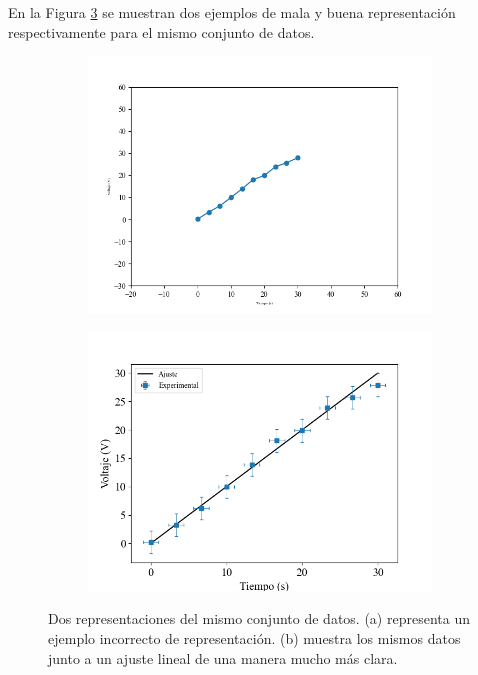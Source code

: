 \documentclass{book}
\begin{document}
En la Figura \ref{fig:dosgrafs} se muestran dos ejemplos de mala y buena representación 
respectivamente para el mismo conjunto de datos.

\begin{figure}[h]
  
  \begin{adjustwidth}{-3cm}{-4.5cm}
  \centering
  \begin{subfigure}{0.45\pdfpagewidth}
      \centering
      \includegraphics[width=\linewidth]{assets/fig/malagrafica.png}
      \caption{}
      \label{fig:malagraf}
  \end{subfigure}
  \hfill
  \begin{subfigure}{0.45\pdfpagewidth}
      \centering
      \includegraphics[width=\linewidth]{assets/fig/buenagrafica.png}
      \caption{}
      \label{fig:buenagraf}
  \end{subfigure}
  \end{adjustwidth}
  \caption{Dos representaciones del mismo conjunto de datos. (a) representa un
  ejemplo incorrecto de representación. (b) muestra los mismos datos junto a un ajuste lineal
  de una manera mucho más clara.}
  \label{fig:dosgrafs}
  
\end{figure}
\end{document}
